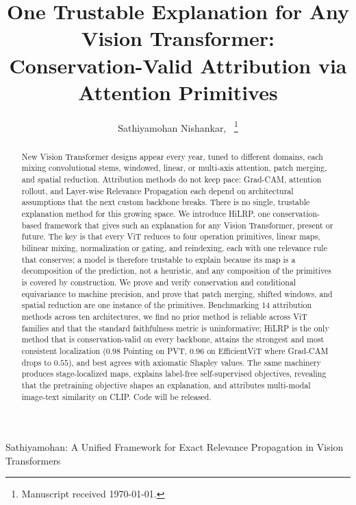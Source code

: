 \documentclass[lettersize,journal]{IEEEtran}
\begin{document}

\title{One Trustable Explanation for Any Vision Transformer:\\ Conservation-Valid Attribution via Attention Primitives}

\author{Sathiyamohan Nishankar,~
  \thanks{Manuscript received \today.}}

%
         {Sathiyamohan: A Unified Framework for Exact Relevance Propagation in Vision Transformers}

\maketitle

\begin{abstract}
New Vision Transformer designs appear every year, tuned to different domains, each mixing convolutional stems, windowed, linear, or multi-axis attention, patch merging, and spatial reduction. Attribution methods do not keep pace: Grad-CAM, attention rollout, and Layer-wise Relevance Propagation each depend on architectural assumptions that the next custom backbone breaks. There is no single, trustable explanation method for this growing space. We introduce HiLRP, one conservation-based framework that gives such an explanation for any Vision Transformer, present or future. The key is that every ViT reduces to four operation primitives, linear maps, bilinear mixing, normalization or gating, and reindexing, each with one relevance rule that conserves; a model is therefore trustable to explain because its map is a decomposition of the prediction, not a heuristic, and any composition of the primitives is covered by construction. We prove and verify conservation and conditional equivariance to machine precision, and prove that patch merging, shifted windows, and spatial reduction are one instance of the primitives. Benchmarking 14 attribution methods across ten architectures, we find no prior method is reliable across ViT families and that the standard faithfulness metric is uninformative; HiLRP is the only method that is conservation-valid on every backbone, attains the strongest and most consistent localization ($0.98$ Pointing on PVT, $0.96$ on EfficientViT where Grad-CAM drops to $0.55$), and best agrees with axiomatic Shapley values. The same machinery produces stage-localized maps, explains label-free self-supervised objectives, revealing that the pretraining objective shapes an explanation, and attributes multi-modal image-text similarity on CLIP. Code will be released.
\end{abstract}
\end{document}
